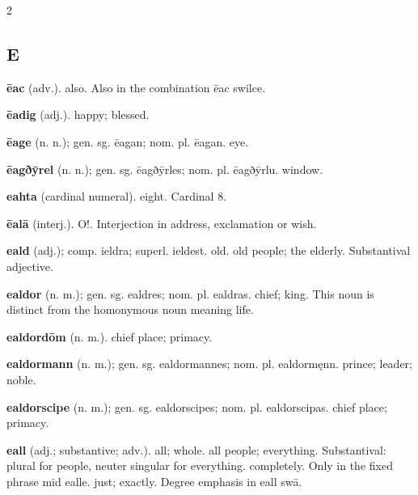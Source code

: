 \begin{multicols*}{2}
\subsection*{E}
\textbf{ēac} (adv.). also. Also in the combination ēac swilce.\par
\textbf{ēadig} (adj.). happy; blessed.\par
\textbf{ēage} (n. n.); gen. sg. ēagan; nom. pl. ēagan. eye.\par
\textbf{ēagðȳrel} (n. n.); gen. sg. ēagðȳrles; nom. pl. ēagðȳrlu. window.\par
\textbf{eahta} (cardinal numeral). eight. Cardinal 8.\par
\textbf{ēalā} (interj.). O!. Interjection in address, exclamation or wish.\par
\textbf{eald} (adj.); comp. ieldra; superl. ieldest. old. old people; the elderly. Substantival adjective.\par
\textbf{ealdor} (n. m.); gen. sg. ealdres; nom. pl. ealdras. chief; king. This noun is distinct from the homonymous noun meaning life.\par
\textbf{ealdordōm} (n. m.). chief place; primacy.\par
\textbf{ealdormann} (n. m.); gen. sg. ealdormannes; nom. pl. ealdormęnn. prince; leader; noble.\par
\textbf{ealdorscipe} (n. m.); gen. sg. ealdorscipes; nom. pl. ealdorscipas. chief place; primacy.\par
\textbf{eall} (adj.; substantive; adv.). all; whole. all people; everything. Substantival: plural for people, neuter singular for everything. completely. Only in the fixed phrase mid ealle. just; exactly. Degree emphasis in eall swā.\par

\end{multicols*}
